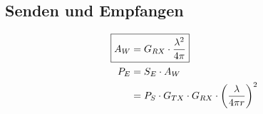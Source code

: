 \subsection{Senden und Empfangen}
\begin{align*}
    \Aboxed{A_W & = G_{RX}\cdot\frac{\lambda^2}{4\pi}}                                     \\
    P_E         & = S_E\cdot A_W                                                           \\
                & = P_S\cdot G_{TX}\cdot G_{RX}\cdot \left(\frac{\lambda}{4\pi r}\right)^2
\end{align*}

